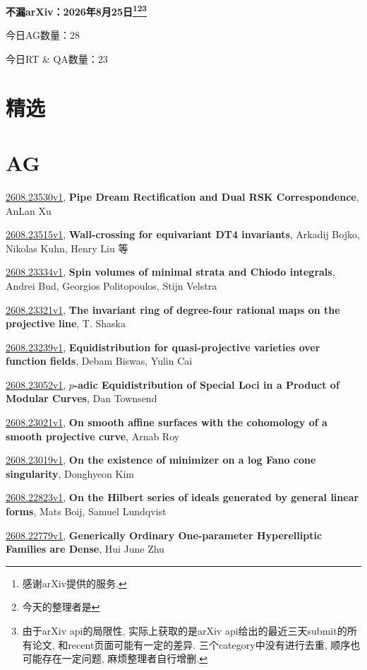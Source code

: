\documentclass[9pt, a4paper]{article}
\theoremstyle{plain}
\theoremstyle{definition}
\theoremstyle{remark}
\newcommand{\arxiv}[3]{\href{https://arxiv.org/abs/#1}{#1}, \textbf{\textcolor{arxivblue}{#2}}, #3}
\newcommand{\AGnumber}{28}
\newcommand{\RTQAnumber}{23}
\newcommand{\NewestDate}{2026年8月25日}
\newcommand{\todayarXiver}{} %
\begin{document}
\begin{center}
    \Huge\textbf{不漏arXiv：\NewestDate\footnote{感谢arXiv提供的服务.}\footnote{今天的整理者是\todayarXiver}\footnote{由于arXiv api的局限性, 实际上获取的是arXiv api给出的最近三天submit的所有论文, 和recent页面可能有一定的差异. 三个category中没有进行去重, 顺序也可能存在一定问题, 麻烦整理者自行增删.}} \\
\end{center}

\setcounter{section}{-1}

\begin{center}
    今日AG数量：\AGnumber
    
    今日RT \& QA数量：\RTQAnumber
    
\end{center}


\section{精选}


\section{AG}
\arxiv{2608.23530v1}{Pipe Dream Rectification and Dual RSK Correspondence}{AnLan Xu}

\arxiv{2608.23515v1}{Wall-crossing for equivariant DT4 invariants}{Arkadij Bojko, Nikolas Kuhn, Henry Liu 等}

\arxiv{2608.23334v1}{Spin volumes of minimal strata and Chiodo integrals}{Andrei Bud, Georgios Politopoulos, Stijn Velstra}

\arxiv{2608.23321v1}{The invariant ring of degree-four rational maps on the projective line}{T. Shaska}

\arxiv{2608.23239v1}{Equidistribution for quasi-projective varieties over function fields}{Debam Biswas, Yulin Cai}

\arxiv{2608.23052v1}{$p$-adic Equidistribution of Special Loci in a Product of Modular Curves}{Dan Townsend}

\arxiv{2608.23021v1}{On smooth affine surfaces with the cohomology of a smooth projective curve}{Arnab Roy}

\arxiv{2608.23019v1}{On the existence of minimizer on a log Fano cone singularity}{Donghyeon Kim}

\arxiv{2608.22823v1}{On the Hilbert series of ideals generated by general linear forms}{Mats Boij, Samuel Lundqvist}

\arxiv{2608.22779v1}{Generically Ordinary One-parameter Hyperelliptic Families are Dense}{Hui June Zhu}
\end{document}
